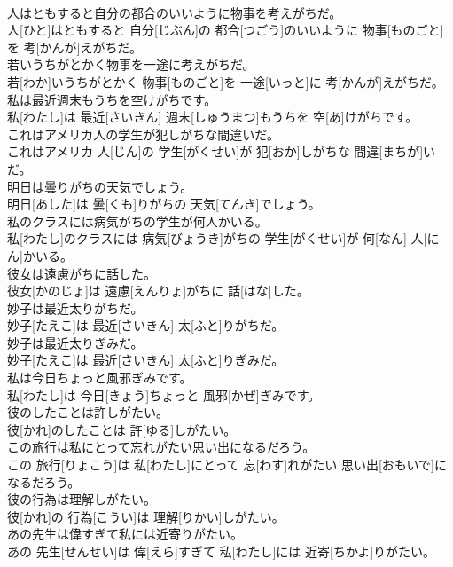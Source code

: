 \documentclass[8pt]{extreport}
\begin{document}
\begin{CJK}{UTF8}{min}
\\	人はともすると自分の都合のいいように物事を考えがちだ。	
\\	人[ひと]はともすると 自分[じぶん]の 都合[つごう]のいいように 物事[ものごと]を 考[かんが]えがちだ。
\\	若いうちがとかく物事を一途に考えがちだ。	
\\	若[わか]いうちがとかく 物事[ものごと]を 一途[いっと]に 考[かんが]えがちだ。
\\	私は最近週末もうちを空けがちです。	
\\	私[わたし]は 最近[さいきん] 週末[しゅうまつ]もうちを 空[あ]けがちです。
\\	これはアメリカ人の学生が犯しがちな間違いだ。	
\\	これはアメリカ 人[じん]の 学生[がくせい]が 犯[おか]しがちな 間違[まちが]いだ。
\\	明日は曇りがちの天気でしょう。	
\\	明日[あした]は 曇[くも]りがちの 天気[てんき]でしょう。
\\	私のクラスには病気がちの学生が何人かいる。	
\\	私[わたし]のクラスには 病気[びょうき]がちの 学生[がくせい]が 何[なん] 人[にん]かいる。
\\	彼女は遠慮がちに話した。	
\\	彼女[かのじょ]は 遠慮[えんりょ]がちに 話[はな]した。
\\	妙子は最近太りがちだ。	
\\	妙子[たえこ]は 最近[さいきん] 太[ふと]りがちだ。
\\	妙子は最近太りぎみだ。	
\\	妙子[たえこ]は 最近[さいきん] 太[ふと]りぎみだ。
\\	私は今日ちょっと風邪ぎみです。	
\\	私[わたし]は 今日[きょう]ちょっと 風邪[かぜ]ぎみです。
\\	彼のしたことは許しがたい。	
\\	彼[かれ]のしたことは 許[ゆる]しがたい。
\\	この旅行は私にとって忘れがたい思い出になるだろう。	
\\	この 旅行[りょこう]は 私[わたし]にとって 忘[わす]れがたい 思い出[おもいで]になるだろう。
\\	彼の行為は理解しがたい。	
\\	彼[かれ]の 行為[こうい]は 理解[りかい]しがたい。
\\	あの先生は偉すぎて私には近寄りがたい。	
\\	あの 先生[せんせい]は 偉[えら]すぎて 私[わたし]には 近寄[ちかよ]りがたい。

\end{CJK}
\end{document}
